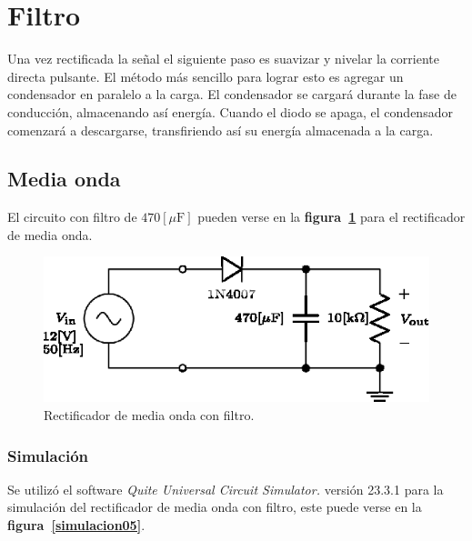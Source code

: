 \section{Filtro}
Una vez rectificada la señal el siguiente paso es suavizar y nivelar la
corriente directa pulsante. El método más sencillo para lograr esto es agregar
un condensador en paralelo a la carga. El condensador se cargará durante la fase
de conducción, almacenando así energía. Cuando el diodo se apaga, el condensador
comenzará a descargarse, transfiriendo así su energía almacenada a la carga.

\subsection{Media onda}
El circuito con filtro de $470[\mu\text{F}]$ pueden verse en la
\textbf{figura~\ref{circuito05}} para el rectificador de media onda.

\begin{figure}[!h]
\centering
\includegraphics[scale=1.1]{diagramas/05.media_onda2.eps}
\caption{Rectificador de media onda con filtro.}
\label{circuito05}
\end{figure}

\subsubsection{Simulación}
Se utilizó el software \emph{Quite Universal Circuit Simulator.} versión 23.3.1
para la simulación del rectificador de media onda con filtro, este puede verse
en la \textbf{figura~\ref{simulacion05}}.

